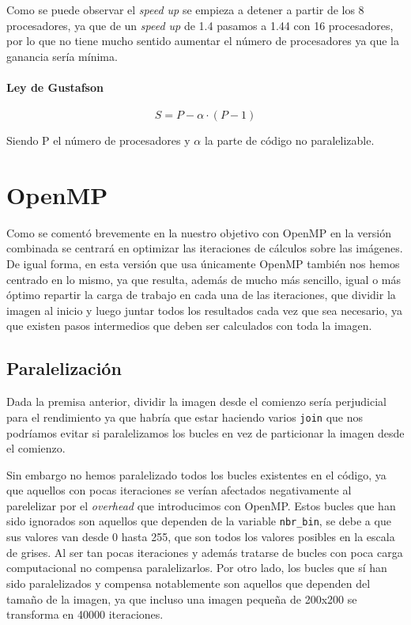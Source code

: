 \documentclass[12pt]{report} %
\begin{document}
Como se puede observar el \textit{speed up} se empieza a detener a partir de los 8 procesadores, ya que de un \textit{speed up} de 1.4 pasamos a 1.44 con 16 procesadores, por lo que no tiene mucho sentido aumentar el número de procesadores ya que la ganancia sería mínima.

\subsubsection{Ley de Gustafson}
\label{sec:Gustafson}

\[ S = P - \alpha \cdot (P - 1)\]

Siendo P el número de procesadores y $\alpha$ la parte de código no paralelizable.


\chapter{OpenMP}
\label{chap:OpenMP}

Como se comentó brevemente en la  nuestro objetivo con OpenMP en la versión combinada se centrará en optimizar las iteraciones de cálculos sobre las imágenes. De igual forma, en esta versión que usa únicamente OpenMP también nos hemos centrado en lo mismo, ya que resulta, además de mucho más sencillo, igual o más óptimo repartir la carga de trabajo en cada una de las iteraciones, que dividir la imagen al inicio y luego juntar todos los resultados cada vez que sea necesario, ya que existen pasos intermedios que deben ser calculados con toda la imagen.


\section{Paralelización}

Dada la premisa anterior, dividir la imagen desde el comienzo sería perjudicial para el rendimiento ya que habría que estar haciendo varios \texttt{join} que nos podríamos evitar si paralelizamos los bucles en vez de particionar la imagen desde el comienzo.

Sin embargo no hemos paralelizado todos los bucles existentes en el código, ya que aquellos con pocas iteraciones se verían afectados negativamente al parelelizar por el \textit{overhead} que introducimos con OpenMP. Estos bucles que han sido ignorados son aquellos que dependen de la variable \texttt{nbr\_bin}, se debe a que sus valores van desde 0 hasta 255, que son todos los valores posibles en la escala de grises. Al ser tan pocas iteraciones y además tratarse de bucles con poca carga computacional no compensa paralelizarlos. Por otro lado, los bucles que sí han sido paralelizados y compensa notablemente son aquellos que dependen del tamaño de la imagen, ya que incluso una imagen pequeña de 200x200 se transforma en 40000 iteraciones.
\end{document}
